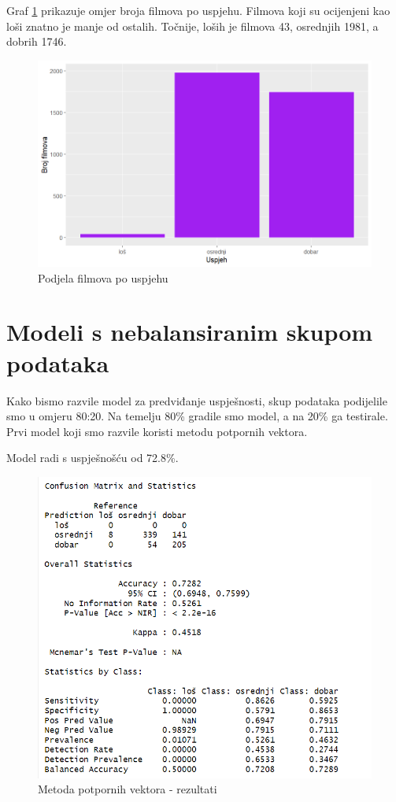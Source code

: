 Graf \ref{fig:ml1} prikazuje omjer broja filmova po uspjehu. Filmova koji su ocijenjeni kao loši znatno je manje od ostalih. Točnije, loših je filmova 43, osrednjih 1981, a dobrih 1746.

\begin{figure}[H]
	\centering
	\includegraphics[width=15cm]{../figures/expl/001.png}
	\caption{Podjela filmova po uspjehu}
	\label{fig:ml1}
\end{figure}

\section{Modeli s nebalansiranim skupom podataka}
Kako bismo razvile model za predviđanje uspješnosti, skup podataka podijelile smo u omjeru 80:20. Na temelju 80\% gradile smo model, a na 20\% ga testirale. \\
Prvi model koji smo razvile koristi metodu potpornih vektora. 



Model radi s uspješnošću od 72.8\%.

\begin{figure}[H]
	\centering
	\includegraphics[width=15cm]{../figures/expl/002.png}
	\caption{Metoda potpornih vektora - rezultati}
	\label{fig:ml2}
\end{figure}

